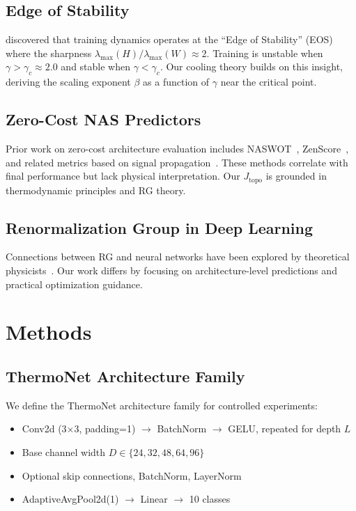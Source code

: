 \documentclass[11pt, a4paper]{article}
\theoremstyle{plain}
\begin{document}
\subsection{Edge of Stability}
\citet{cohen2021theory} discovered that training dynamics operates at the ``Edge of Stability'' (EOS) where the sharpness $\lambda_{\max}(H)/\lambda_{\max}(W) \approx 2$. Training is unstable when $\gamma > \gamma_c \approx 2.0$ and stable when $\gamma < \gamma_c$. Our cooling theory builds on this insight, deriving the scaling exponent $\beta$ as a function of $\gamma$ near the critical point.

\subsection{Zero-Cost NAS Predictors}
Prior work on zero-cost architecture evaluation includes NASWOT~\citep{abdelfattah2021no}, ZenScore~\citep{zhai2019nas}, and related metrics based on signal propagation~\citep{shu2022free}. These methods correlate with final performance but lack physical interpretation. Our $J_{\mathrm{topo}}$ is grounded in thermodynamic principles and RG theory.

\subsection{Renormalization Group in Deep Learning}
Connections between RG and neural networks have been explored by theoretical physicists~\citep{mehta2014exact,li2021origin,kleinert2018renormalization}. Our work differs by focusing on architecture-level predictions and practical optimization guidance.

\section{Methods}

\subsection{ThermoNet Architecture Family}
We define the ThermoNet architecture family for controlled experiments:
\begin{itemize}
\item Conv2d (3$\times$3, padding=1) $\rightarrow$ BatchNorm $\rightarrow$ GELU, repeated for depth $L$
\item Base channel width $D \in \{24, 32, 48, 64, 96\}$
\item Optional skip connections, BatchNorm, LayerNorm
\item AdaptiveAvgPool2d(1) $\rightarrow$ Linear $\rightarrow$ 10 classes
\end{itemize}
\end{document}
